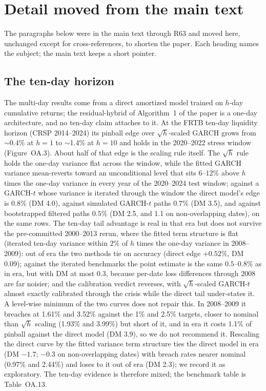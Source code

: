 \documentclass[11pt]{article}
\begin{document}
\section{Detail moved from the main text}\label{sec:moved}

The paragraphs below were in the main text through R63 and moved here, unchanged except for cross-references, to shorten the paper. Each heading names the subject; the main text keeps a short pointer.

\subsection*{The ten-day horizon}
The multi-day results come from a direct amortized model trained on
$h$-day cumulative returns; the residual-hybrid of Algorithm~1 of the paper is a
one-day architecture, and no ten-day claim attaches to it. At the FRTB
ten-day liquidity horizon (CRSP 2014--2024) its pinball edge over
$\sqrt{h}$-scaled GARCH grows from $\sim$0.4\% at $h=1$ to $\sim$1.4\% at
$h=10$ and holds in the 2020--2022 stress window (Figure~OA.3). About half of that edge is the scaling rule itself. The
$\sqrt{h}$ rule holds the one-day variance flat across the window, while
the fitted GARCH variance mean-reverts toward an unconditional level that
sits $6$--$12\%$ above $h$ times the one-day variance in every year of
the 2020--2024 test window; against a GARCH-$t$ whose variance is
iterated through the window the direct model's edge is $0.8\%$ (DM 4.0),
against simulated GARCH-$t$ paths $0.7\%$ (DM 3.5), and against
bootstrapped filtered paths $0.5\%$ (DM 2.5, and 1.1 on non-overlapping dates), on the same rows. The
ten-day tail advantage is real in that era but does not survive the
pre-committed 2000--2013 rerun, where the fitted term structure is flat
(iterated ten-day variance within $2\%$ of $h$ times the one-day
variance in 2008--2009): out of era the two methods tie on accuracy
(direct edge $+0.52\%$, DM 0.09); against the iterated benchmarks the
point estimate is the same $0.5$--$0.8\%$ as in era, but with DM at most
0.3, because per-date loss differences through 2008 are far noisier; and the calibration
verdict reverses, with $\sqrt{h}$-scaled GARCH-$t$ almost exactly
calibrated through the crisis while the direct tail under-states it. A
level-wise minimum of the two curves does not repair this. In 2008--2009
it breaches at 1.61\% and 3.52\% against the 1\% and 2.5\% targets, closer
to nominal than $\sqrt{h}$ scaling (1.93\% and 3.99\%) but short of it, and
in era it costs 1.1\% of pinball against the direct model (DM 3.9), so we
do not recommend it. Rescaling the direct curve by the fitted variance term
structure ties the direct model in era (DM $-1.7$; $-0.3$ on
non-overlapping dates) with breach rates nearer nominal (0.97\% and
2.44\%) and loses to it out of era (DM 2.3); we record it as exploratory.
The ten-day evidence is therefore mixed; the benchmark
table is Table~OA.13.
\end{document}
